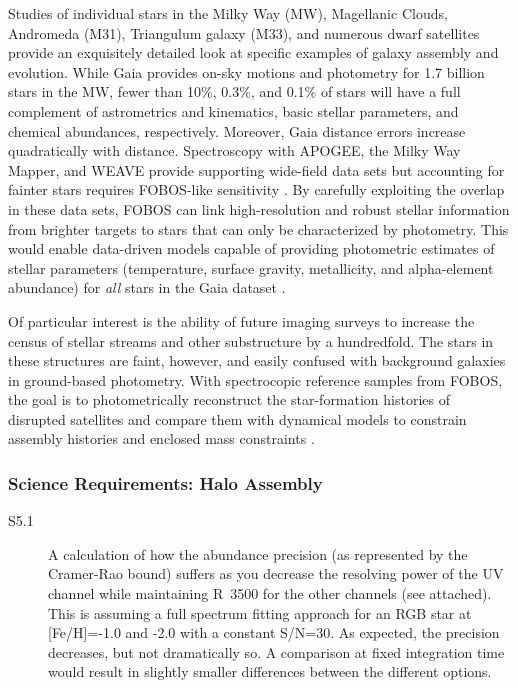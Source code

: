 \documentclass[preprint,11pt]{aastex}
\begin{document}
Studies of individual stars in the Milky Way (MW), Magellanic Clouds, Andromeda (M31), Triangulum galaxy (M33), and
numerous dwarf satellites provide an exquisitely detailed look at specific examples of galaxy assembly and evolution.
While Gaia provides on-sky motions and photometry for 1.7 billion stars in the MW, fewer than 10\%, 0.3\%, and 0.1\% of
stars will have a full complement of astrometrics and kinematics, basic stellar parameters, and chemical abundances,
respectively.  Moreover, Gaia distance errors increase quadratically with distance.  Spectroscopy with APOGEE, the
Milky Way Mapper, and WEAVE provide supporting wide-field data sets but accounting for fainter stars requires
FOBOS-like sensitivity \citep[see][]{dey19,sanderson19}.  By carefully exploiting the overlap in these data sets, FOBOS
can link high-resolution and robust stellar information from brighter targets to stars that can only be characterized
by photometry.  This would enable data-driven models capable of providing photometric estimates of stellar
parameters (temperature, surface gravity, metallicity, and alpha-element abundance) for {\it all} stars in the Gaia
dataset  \citep[see][]{2015ApJ...808...16N, 2018arXiv180401530T, 2018arXiv180803278T}.

Of particular interest is the ability of future imaging surveys to increase the census of stellar streams and other
substructure by a hundredfold.  The stars in these structures are faint, however, and easily confused with background
galaxies in ground-based photometry.  With spectrocopic reference samples from FOBOS, the goal is to photometrically
reconstruct the star-formation histories of disrupted satellites and compare them with dynamical models to constrain
assembly histories and enclosed mass constraints \citep[e.g.,][]{2017ApJ...836..234S}.



\subsubsection{Science Requirements: Halo Assembly}

\begin{description}

\item[S5.1] 

A calculation of how the abundance precision (as represented by the Cramer-Rao bound) suffers as you decrease the resolving power of the UV channel while maintaining R~3500 for the other channels (see attached). This is assuming a full spectrum fitting approach for an RGB star at [Fe/H]=-1.0 and -2.0 with a constant S/N=30. As expected, the precision decreases, but not dramatically so. A comparison at fixed integration time would result in slightly smaller differences between the different options.

\end{description}
\end{document}
